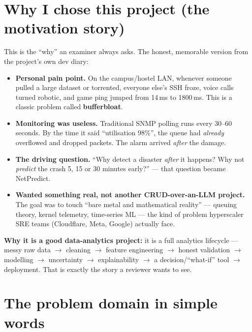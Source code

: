 \documentclass[11pt,a4paper]{article}
\newcommand{\note}[1]{%
  \par\vspace{3pt}\noindent
  \colorbox{soft}{\parbox{\dimexpr\linewidth-2\fboxsep}{\small #1}}%
  \par\vspace{3pt}}
\begin{document}
\section{Why I chose this project (the motivation story)}
This is the ``why'' an examiner always asks. The honest, memorable version from the project's own dev diary:

\begin{itemize}
  \item \textbf{Personal pain point.} On the campus/hostel LAN, whenever someone pulled a large dataset or
  torrented, everyone else's SSH froze, voice calls turned robotic, and game ping jumped from 14\,ms to
  1800\,ms. This is a classic problem called \textbf{bufferbloat}.
  \item \textbf{Monitoring was useless.} Traditional SNMP polling runs every 30--60 seconds. By the time it
  said ``utilisation 98\%'', the queue had \emph{already} overflowed and dropped packets. The alarm arrived
  \emph{after} the damage.
  \item \textbf{The driving question.} ``Why detect a disaster \emph{after} it happens? Why not \emph{predict}
  the crash 5, 15 or 30 minutes early?'' --- that question became NetPredict.
  \item \textbf{Wanted something real, not another CRUD-over-an-LLM project.} The goal was to touch
  ``bare metal and mathematical reality'' --- queuing theory, kernel telemetry, time-series ML ---
  the kind of problem hyperscaler SRE teams (Cloudflare, Meta, Google) actually face.
\end{itemize}

\note{\textbf{Why it is a good data-analytics project:} it is a full analytics lifecycle --- messy raw data
$\rightarrow$ cleaning $\rightarrow$ feature engineering $\rightarrow$ honest validation $\rightarrow$
modelling $\rightarrow$ uncertainty $\rightarrow$ explainability $\rightarrow$ a decision/``what-if'' tool
$\rightarrow$ deployment. That is exactly the story a reviewer wants to see.}

\section{The problem domain in simple words}
\end{document}
